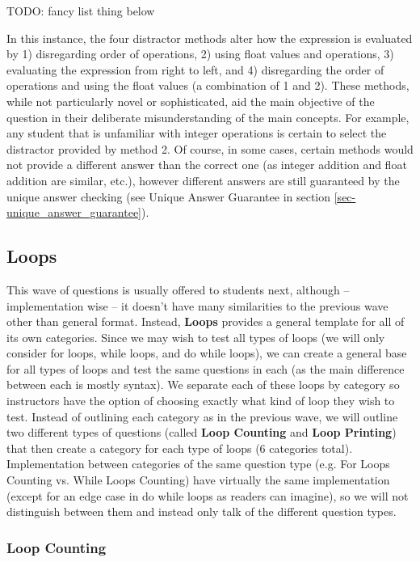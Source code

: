 \documentclass{article}
\begin{document}
TODO: fancy list thing below

In this instance, the four distractor methods alter how the expression is evaluated by 1) disregarding order of operations, 2) using float values and operations, 3) evaluating the expression from
right to left, and 4) disregarding the order of operations and using the float values (a combination of 1 and 2). These methods, while not particularly novel or sophisticated, aid the main objective 
of the question in their deliberate misunderstanding of the main concepts. For example, any student that is unfamiliar with integer operations is certain to select the distractor provided by method 2. Of course, in some cases, certain methods would not provide a different answer than the correct one (as integer addition and float addition are similar, etc.), however different answers are still guaranteed by the unique answer checking (see Unique Answer Guarantee in section \ref{sec-unique_answer_guarantee}).

\subsection{Loops} \label{subsec-loops}

This wave of questions is usually offered to students next, although -- implementation wise -- it doesn't have many similarities to the previous wave other than general format. Instead, \textbf{Loops} provides 
a general template for all of its own categories. Since we may wish to test all types of loops (we will only consider for loops, while loops, and do while loops), we can create a general base for 
all types of loops and test the same questions in each (as the main difference between each is mostly syntax). We separate each of these loops by category so instructors have the option of 
choosing exactly what kind of loop they wish to test. Instead of outlining each category as in the previous wave, we will outline two different types of questions (called \textbf{Loop Counting} and \textbf{Loop Printing}) that then create a category for each type of loops (6 categories total). Implementation between categories of the same question type (e.g. For Loops Counting vs. While Loops Counting) have virtually the same implementation (except for an edge case in do while loops as readers can imagine), so we will not distinguish between them and instead only talk of the different question types.

\subsubsection{Loop Counting} \label{subsubsec-loop_counting}
\end{document}
